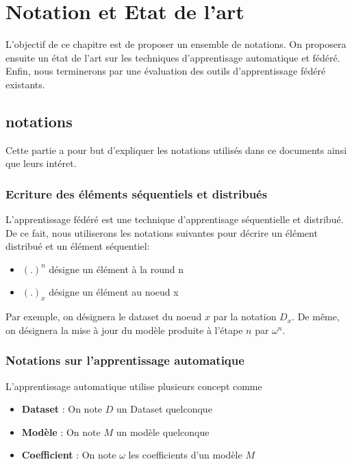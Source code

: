 \documentclass[stage3a]{tnreport} %
\begin{document}
\chapter{Notation et Etat de l'art}

L'objectif de ce chapitre est de proposer un ensemble de notations. On proposera ensuite un état de l'art sur les techniques d'apprentisage automatique et fédéré. Enfin, nous terminerons par une évaluation des outils d'apprentissage fédéré existants.

\section{notations}

Cette partie a pour but d'expliquer les notations utilisés dans ce documents ainsi que leurs intéret.

\subsection{Ecriture des éléments séquentiels et distribués}

L'apprentissage fédéré est une technique d'apprentisage séquentielle et distribué. De ce fait, nous utiliserons les notations suivantes pour décrire un élément distribué et un élément séquentiel:

\begin{itemize}
  \item \textbf{$(.)^n$} désigne un élément à la round n
  \item \textbf{$(.)_x$} désigne un élément au noeud x
\end{itemize}

Par exemple, on désignera le dataset du noeud $x$ par la notation $D_x$. De même, on désignera la mise à jour du modèle produite à l'étape $n$ par 
$\omega^n$.

\subsection{Notations sur l'apprentissage automatique}

L'apprentissage automatique utilise plusieurs concept comme 

\begin{itemize}
  \item \textbf{Dataset} : On note $D$ un Dataset quelconque
  \item \textbf{Modèle} : On note $M$ un modèle quelconque
  \item \textbf{Coefficient} : On note $\omega$ les coefficients d'un modèle $M$
\end{itemize}
\end{document}

